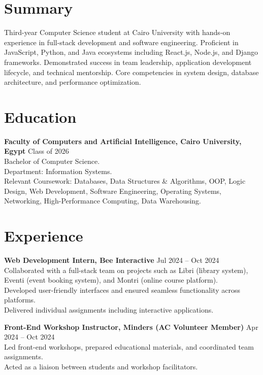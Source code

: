 
\section*{Summary}
Third-year Computer Science student at Cairo University with hands-on experience in full-stack development and software engineering. Proficient in JavaScript, Python, and Java ecosystems including React.js, Node.js, and Django frameworks. Demonstrated success in team leadership, application development lifecycle, and technical mentorship. Core competencies in system design, database architecture, and performance optimization.


\section*{Education}
\textbf{Faculty of Computers and Artificial Intelligence, Cairo University, Egypt} \hfill Class of 2026 \\
Bachelor of Computer Science. \\
Department: Information Systems. \\
Relevant Coursework: Databases, Data Structures \& Algorithms, OOP, Logic Design, Web Development, Software Engineering, Operating Systems, Networking, High-Performance Computing, Data Warehousing.


\section*{Experience}
\textbf{Web Development Intern, Bee Interactive} \hfill Jul 2024 -- Oct 2024 \\
\textbullet{}\hspace{2mm} Collaborated with a full-stack team on projects such as Libri (library system), Eventi (event booking system), and Montri (online course platform).  \\
\textbullet{}\hspace{2mm} Developed user-friendly interfaces and ensured seamless functionality across platforms.  \\
\textbullet{}\hspace{2mm} Delivered individual assignments including interactive applications.

\textbf{Front-End Workshop Instructor, Minders (AC Volunteer Member)} \hfill Apr 2024 -- Oct 2024 \\
\textbullet{}\hspace{2mm} Led front-end workshops, prepared educational materials, and coordinated team assignments.  \\
\textbullet{}\hspace{2mm} Acted as a liaison between students and workshop facilitators.

